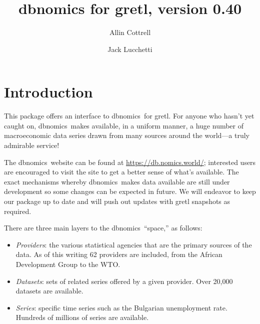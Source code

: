 \documentclass{article}
\begin{document}
\setlength{\parindent}{0pt}
\setlength{\parskip}{1ex}
\setcounter{secnumdepth}{1}


\newenvironment{funcdoc}
{\noindent\hrulefill\\[-10pt]}
{\medskip}

\newcommand{\argname}[1]{\textsl{#1}}
\newcommand{\DB}{\textsf{dbnomics}}
  
\title{dbnomics for gretl, version 0.40}
\author{Allin Cottrell \and Jack Lucchetti}
\maketitle

\section{Introduction}
\label{sec:intro}

This package offers an interface to \DB\ for gretl. For
anyone who hasn't yet caught on, \DB\  makes available, in
a uniform manner, a huge number of macroeconomic data series drawn
from many sources around the world---a truly admirable service!

The \DB\ website can be found at \url{https://db.nomics.world/};
interested users are encouraged to visit the site to get a better
sense of what's available. The exact mechanisms whereby \DB\ makes
data available are still under development so some changes can be
expected in future. We will endeavor to keep our package up to date
and will push out updates with gretl snapshots as required.

There are three main layers to the \DB\ ``space,'' as
follows:
\begin{itemize}
\item \textit{Providers}: the various statistical agencies that are
  the primary sources of the data. As of this writing 62 providers
  are included, from the African Development Group to the WTO.
\item \textit{Datasets}: sets of related series offered by a given
  provider. Over 20,000 datasets are available.
\item \textit{Series}: specific time series such as the Bulgarian
  unemployment rate. Hundreds of millions of series are available.
\end{itemize}
\end{document}
